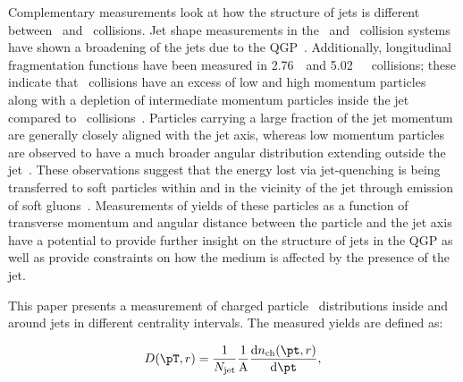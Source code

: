 Complementary measurements look at how the structure of jets is different between \pbpb\ and \pp\
collisions.
Jet shape measurements in the \pp\ and \pbpb\ collision systems have shown 
a broadening of the jets due to the QGP~\cite{Aad:2011sc, Acharya:2018uvf, Chatrchyan:2012mec, Chatrchyan:2013kwa}.
Additionally, longitudinal fragmentation functions have been measured in 2.76~\TeV\ and 5.02~\TeV\ \pbpb\
collisions;
these indicate that \pbpb\ collisions have an excess of low and high momentum particles along with a depletion of intermediate momentum particles inside the jet compared to \pp\ collisions~\cite{Aad:2014wha,Chatrchyan:2014ava,Aaboud:2017bzv,Aaboud:2018hpb}. Particles carrying a large fraction of the jet momentum are generally closely
aligned with the jet axis, whereas low momentum particles are observed to have a much broader
angular distribution extending outside the 
jet~\cite{Chatrchyan:2011sx,Khachatryan:2015lha,Khachatryan:2016tfj,Sirunyan:2018jqr}. 
These observations suggest that the energy lost via jet-quenching is being transferred to soft particles within and in the vicinity of the 
jet through emission of soft 
gluons~\cite{Vitev:2008rz,Ovanesyan:2011xy,Blaizot:2014ula,Qin:2015srf,Escobedo:2016jbm,Casalderrey-Solana:2016jvj,Tachibana:2017syd}. 
Measurements of yields of these particles as a function of transverse momentum and
angular distance between the particle and the jet axis have a potential to provide further insight
on the structure of jets in the QGP as well as provide constraints on how the medium is affected by the presence of the jet. 

This paper presents a measurement of charged particle \pt\ distributions inside and around jets in different centrality intervals. The measured yields are defined as:

\begin{align*}
\Dptr = \frac{1}{N_{\mathrm{jet}}} \frac{1}{\mathrm{A}} \frac{\mathrm{d} n_{\mathrm{ch}} (\pt, r)}{\mathrm{d} \pt},
\end{align*}

